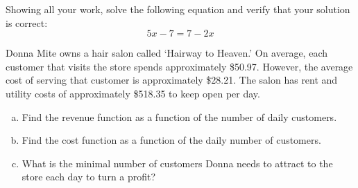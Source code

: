 \documentclass[11pt,letterpaper]{article}
\begin{document}
\prob Showing all your work, solve the following equation and verify that your solution is correct:
	\[
	5x - 7= 7 - 2x
	\] \pspace
	

\prob Donna Mite owns a hair salon called `Hairway to Heaven.' On average, each customer that visits the store spends approximately \$50.97. However, the average cost of serving that customer is approximately \$28.21. The salon has rent and utility costs of approximately \$518.35 to keep open per day. 
	\begin{enumerate}[(a)]
	\item Find the revenue function as a function of the number of daily customers. 
	\item Find the cost function as a function of the daily number of customers. 
	\item What is the minimal number of customers Donna needs to attract to the store each day to turn a profit? 
	\end{enumerate} 
   
\end{document}
